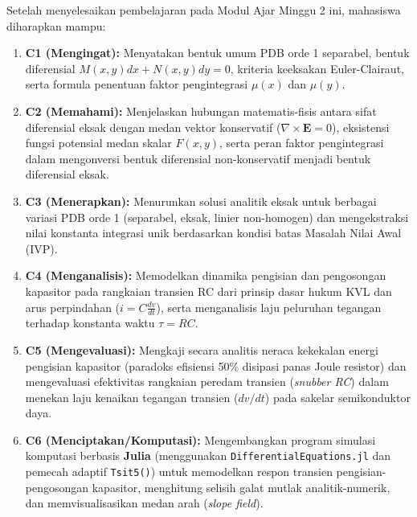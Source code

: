 \documentclass[11pt,a4paper]{article}
\theoremstyle{definition}
\begin{document}
\begin{tcolorbox}[colback=blue!5!white,colframe=headercolor,title=\textbf{Capaian Pembelajaran Khusus (Sub-CPMK 2)}]
Setelah menyelesaikan pembelajaran pada Modul Ajar Minggu 2 ini, mahasiswa diharapkan mampu:
\begin{enumerate}[leftmargin=*]
    \item \textbf{C1 (Mengingat):} Menyatakan bentuk umum PDB orde 1 separabel, bentuk diferensial $M(x,y)dx + N(x,y)dy = 0$, kriteria keeksakan Euler-Clairaut, serta formula penentuan faktor pengintegrasi $\mu(x)$ dan $\mu(y)$.
    \item \textbf{C2 (Memahami):} Menjelaskan hubungan matematis-fisis antara sifat diferensial eksak dengan medan vektor konservatif ($\nabla \times \mathbf{E} = 0$), eksistensi fungsi potensial medan skalar $F(x,y)$, serta peran faktor pengintegrasi dalam mengonversi bentuk diferensial non-konservatif menjadi bentuk diferensial eksak.
    \item \textbf{C3 (Menerapkan):} Menurunkan solusi analitik eksak untuk berbagai variasi PDB orde 1 (separabel, eksak, linier non-homogen) dan mengekstraksi nilai konstanta integrasi unik berdasarkan kondisi batas Masalah Nilai Awal (IVP).
    \item \textbf{C4 (Menganalisis):} Memodelkan dinamika pengisian dan pengosongan kapasitor pada rangkaian transien RC dari prinsip dasar hukum KVL dan arus perpindahan ($i = C \frac{dv}{dt}$), serta menganalisis laju peluruhan tegangan terhadap konstanta waktu $\tau = RC$.
    \item \textbf{C5 (Mengevaluasi):} Mengkaji secara analitis neraca kekekalan energi pengisian kapasitor (paradoks efisiensi 50\% disipasi panas Joule resistor) dan mengevaluasi efektivitas rangkaian peredam transien (\textit{snubber RC}) dalam menekan laju kenaikan tegangan transien ($dv/dt$) pada sakelar semikonduktor daya.
    \item \textbf{C6 (Menciptakan/Komputasi):} Mengembangkan program simulasi komputasi berbasis \textbf{Julia} (menggunakan \texttt{DifferentialEquations.jl} dan pemecah adaptif \texttt{Tsit5()}) untuk memodelkan respon transien pengisian-pengosongan kapasitor, menghitung selisih galat mutlak analitik-numerik, dan memvisualisasikan medan arah (\textit{slope field}).
\end{enumerate}
\end{tcolorbox}

\vspace{0.3cm}
\tableofcontents
\vspace{0.5cm}
\end{document}
